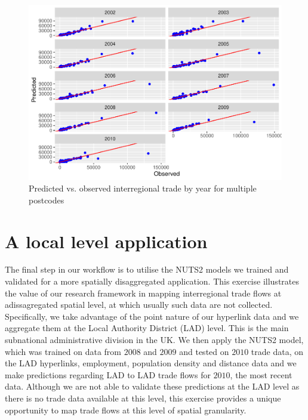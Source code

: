 \documentclass[]{interact}
\theoremstyle{plain}%
\theoremstyle{definition}
\theoremstyle{remark}
\begin{document}
\begin{figure}[p]
\includegraphics[width=1\linewidth]{hl_v2--and-_files/figure-latex/unnamed-chunk-12-1} \caption{\label{prediction_multi_pc}Predicted vs. observed interregional trade by year for multiple postcodes}\label{fig:unnamed-chunk-12}
\end{figure}

\hypertarget{a-local-level-application}{%
\section{A local level application}\label{a-local-level-application}}

The final step in our workflow is to utilise the NUTS2 models we trained
and validated for a more spatially disaggregated application. This
exercise illustrates the value of our research framework in mapping
interregional trade flows at adissagregated spatial level, at which
usually such data are not collected. Specifically, we take advantage of
the point nature of our hyperlink data and we aggregate them at the
Local Authority District (LAD) level. This is the main subnational
administrative division in the UK. We then apply the NUTS2 model, which
was trained on data from \(2008\) and \(2009\) and tested on \(2010\)
trade data, on the LAD hyperlinks, employment, population density and
distance data and we make predictions regarding LAD to LAD trade flows
for \(2010\), the most recent data. Although we are not able to validate
these predictions at the LAD level as there is no trade data available
at this level, this exercise provides a unique opportunity to map trade
flows at this level of spatial granularity.
\end{document}

